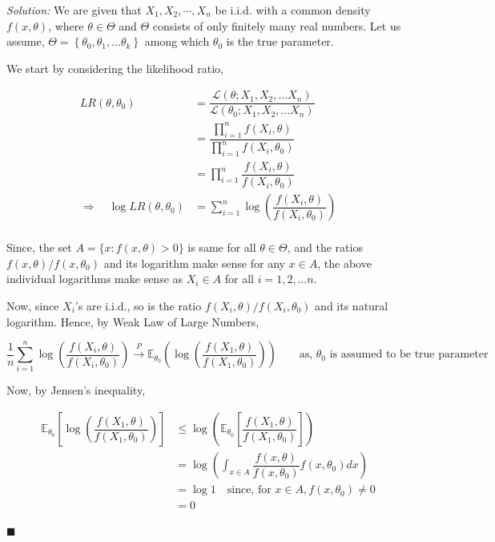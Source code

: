 \documentclass[12pt]{article}
\newcommand{\E}{\mathbb{E}}
\theoremstyle{definition}
\newenvironment{answer}{\textit{Solution: }\quad }{ \hfill $\blacksquare$}
\numberwithin{equation}{section}
\begin{document}
\begin{answer}
    We are given that $X_1,X_2,\cdots,X_n$ be i.i.d. with a common density $f(x,\theta)$, where $\theta \in \Theta$ and $\Theta$ consists of only finitely many real numbers. Let us assume, $\Theta = \left\{ \theta_0, \theta_1, \dots \theta_k \right\}$ among which $\theta_0$ is the true parameter.

    We start by considering the likelihood ratio,

    \begin{align*}
        LR(\theta, \theta_0) & =  \dfrac{\mathcal{L}(\theta; X_1, X_2, \dots X_n)}{\mathcal{L}(\theta_0; X_1, X_2, \dots X_n)}\\
        & = \dfrac{\prod_{i=1}^{n} f(X_i, \theta)}{\prod_{i=1}^{n} f(X_i, \theta_0)}\\
        & = \prod_{i=1}^{n} \dfrac{f(X_i, \theta)}{f(X_i, \theta_0)}\\
        \Rightarrow \quad \log LR(\theta, \theta_0) & = \sum_{i = 1}^{n} \log \left(\dfrac{f(X_i, \theta)}{f(X_i, \theta_0)} \right)\\
    \end{align*}

    Since, the set $A = \{ x: f(x, \theta) > 0 \}$ is same for all $\theta \in \Theta$, and the ratios $f(x, \theta)/f(x, \theta_0)$ and its logarithm make sense for any $x \in A$, the above individual logarithms make sense as $X_i \in A$ for all $i = 1, 2, \dots n$.

    Now, since $X_i$'s are i.i.d., so is the ratio $f(X_i, \theta)/f(X_i, \theta_0)$ and its natural logarithm. Hence, by Weak Law of Large Numbers,

    $$
    \dfrac{1}{n} \sum_{i = 1}^{n} \log \left(\dfrac{f(X_i, \theta)}{f(X_i, \theta_0)} \right) \xrightarrow{P} \E_{\theta_0} \left( \log \left(\dfrac{f(X_1, \theta)}{f(X_1, \theta_0)} \right) \right) \qquad \text{as, } \theta_0 \text{ is assumed to be true parameter}
    $$

    Now, by Jensen's inequality,

    \begin{align*}
        \E_{\theta_0} \left[ \log \left(\dfrac{f(X_1, \theta)}{f(X_1, \theta_0)} \right) \right]
        & \leq \log \left( \E_{\theta_0} \left[ \dfrac{f(X_1, \theta)}{f(X_1, \theta_0)} \right] \right)\\
        & = \log \left( \int_{x \in A} \dfrac{f(x, \theta)}{f(x, \theta_0)} f(x, \theta_0)dx \right)\\
        & = \log 1 \quad \text{since, for } x\in A, f(x, \theta_0) \neq 0\\
        & = 0
    \end{align*}


\end{answer}
\end{document}
